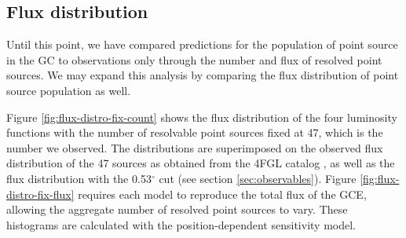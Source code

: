 \documentclass[a4paper,11pt]{article}
\begin{document}
\subsection{Flux distribution}
Until this point, we have compared predictions for the population of point source in the GC to observations only through the number and flux of resolved point sources. We may expand this analysis by comparing the flux distribution of point source population as well.

Figure \ref{fig:flux-distro-fix-count} shows the flux distribution of the four luminosity functions with the number of resolvable point sources fixed at 47, which is the number we observed. The distributions are superimposed on the observed flux distribution of the 47 sources as obtained from the 4FGL catalog \cite{Fermi-LAT:2019yla}, as well as the flux distribution with the 0.53$^\circ$ cut (see section \ref{sec:observables}). Figure \ref{fig:flux-distro-fix-flux} requires each model to reproduce the total flux of the GCE, allowing the aggregate number of resolved point sources to vary. These histograms are calculated with the position-dependent sensitivity model.
\end{document}
